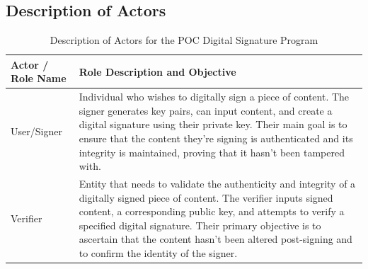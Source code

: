\documentclass[]{final_report}
\theoremstyle{definition}
\begin{document}
\subsection{Description of Actors}
\begin{table}[H]
    \centering
    \caption{Description of Actors for the POC Digital Signature Program}
    \label{tab:actors_description}
    \begin{tabular}{|l|p{10cm}|}
    \hline
    \textbf{Actor / Role Name} & \textbf{Role Description and Objective} \\
    \hline
    User/Signer & Individual who wishes to digitally sign a piece of content. The signer generates key pairs, can input content, and create a digital signature using their private key. Their main goal is to ensure that the content they're signing is authenticated and its integrity is maintained, proving that it hasn't been tampered with. \\
    \hline
    Verifier & Entity that needs to validate the authenticity and integrity of a digitally signed piece of content. The verifier inputs signed content, a corresponding public key, and attempts to verify a specified digital signature. Their primary objective is to ascertain that the content hasn't been altered post-signing and to confirm the identity of the signer. \\
    \hline
    \end{tabular}
\end{table}
\end{document}
